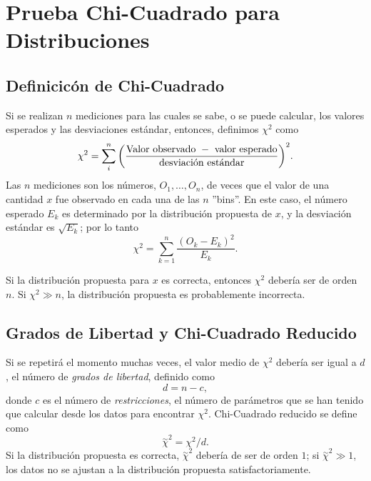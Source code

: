 \section{Prueba Chi-Cuadrado para Distribuciones}
\subsection{Definicicón de Chi-Cuadrado}
Si se realizan $n$ mediciones para las cuales se sabe, o se puede calcular, los valores esperados y las desviaciones estándar, entonces, definimos $\chi ^2$ como
	\begin{equation}
		\chi ^2 = \sum _i ^n \qty(\frac{\text{Valor observado } - \text{ valor esperado}}{\text{desviación estándar}})^2.
	\end{equation}
Las $n$ mediciones son los números, $O_1 ,\ldots ,O_n$, de veces que el valor de una cantidad $x$ fue observado en cada una de las $n$ ''bins''. En este caso, el número esperado $E_k$ es determinado por la distribución propuesta de $x$, y la desviación estándar es $\sqrt{E_k}$; por lo tanto
	\begin{equation}
		\chi ^2 = \sum _{k=1} ^n \frac{(O_k - E_k)^2}{E_k}.
	\end{equation}
\begin{tcolorbox}
	Si la distribución propuesta para $x$ es correcta, entonces $\chi ^2$ debería ser de orden $n$. Si $\chi ^2 \gg n$, la distribución propuesta es probablemente incorrecta.
\end{tcolorbox}

\subsection{Grados de Libertad y Chi-Cuadrado Reducido}
Si se repetirá el momento muchas veces, el valor medio de $\chi ^2$ debería ser igual a $d$, el número de \textit{grados de libertad}, definido como
	\begin{equation}
		d = n - c,
	\end{equation}
donde $c$ es el número de \textit{restricciones}, el número de parámetros que se han tenido que calcular desde los datos para encontrar $\chi ^2$. Chi-Cuadrado reducido se define como
	\begin{equation}
		\overset{\sim}{\chi} ^2 = \chi ^2 /d.
	\end{equation}
Si la distribución propuesta es correcta, $\overset{\sim}{\chi} ^2$ debería de ser de orden $1$; si $\overset{\sim}{\chi} ^2 \gg 1$, los datos no se ajustan a la distribución propuesta satisfactoriamente.

